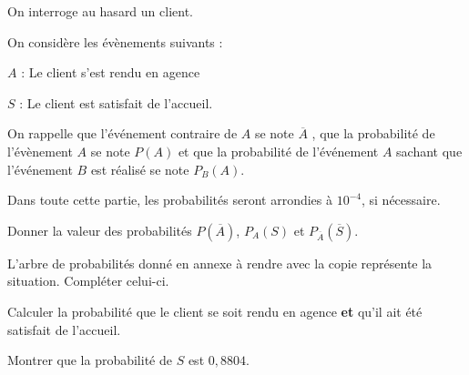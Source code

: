 \documentclass[a4paper,12pt]{scrartcl}
\begin{document}
On interroge au hasard un client.

On considère les évènements suivants :

$A$ : \og{}Le client s'est rendu en agence\fg{}

$S$ : \og{}Le client est satisfait de l'accueil\fg{}.

On rappelle que l'événement contraire de $A$ se note $\overline{A}$ , que la probabilité de l'évènement $A$ se note $P(A)$ et que la probabilité de l'événement $A$ sachant que l'événement $B$ est réalisé se note $P_B(A)$.

Dans toute cette partie, les probabilités seront arrondies à $10^{-4}$, si nécessaire.

\question{}
Donner la valeur des probabilités $P\left(\overline{A}\right)$, $P_A(S)$ et $P_{\overline{A}} \left(\overline{S}\right)$.



\question{}
L'arbre de probabilités donné en annexe à rendre avec la copie représente la situation. Compléter celui-ci.



\question{}
Calculer la probabilité que le client se soit rendu en agence \textbf{et} qu'il ait été satisfait de l'accueil.


\question{}
Montrer que la probabilité de $S$ est $0,8804$. 
\end{document}
